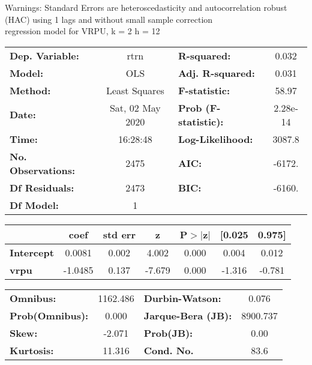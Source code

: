 Warnings: \newline
 [1] Standard Errors are heteroscedasticity and autocorrelation robust (HAC) using 1 lags and without small sample correction\\ 

regression model for VRPU, k = 2 h = 12\begin{center}
\begin{tabular}{lclc}
\toprule
\textbf{Dep. Variable:}    &       rtrn       & \textbf{  R-squared:         } &     0.032   \\
\textbf{Model:}            &       OLS        & \textbf{  Adj. R-squared:    } &     0.031   \\
\textbf{Method:}           &  Least Squares   & \textbf{  F-statistic:       } &     58.97   \\
\textbf{Date:}             & Sat, 02 May 2020 & \textbf{  Prob (F-statistic):} &  2.28e-14   \\
\textbf{Time:}             &     16:28:48     & \textbf{  Log-Likelihood:    } &    3087.8   \\
\textbf{No. Observations:} &        2475      & \textbf{  AIC:               } &    -6172.   \\
\textbf{Df Residuals:}     &        2473      & \textbf{  BIC:               } &    -6160.   \\
\textbf{Df Model:}         &           1      & \textbf{                     } &             \\
\bottomrule
\end{tabular}
\begin{tabular}{lcccccc}
                   & \textbf{coef} & \textbf{std err} & \textbf{z} & \textbf{P$> |$z$|$} & \textbf{[0.025} & \textbf{0.975]}  \\
\midrule
\textbf{Intercept} &       0.0081  &        0.002     &     4.002  &         0.000        &        0.004    &        0.012     \\
\textbf{vrpu}      &      -1.0485  &        0.137     &    -7.679  &         0.000        &       -1.316    &       -0.781     \\
\bottomrule
\end{tabular}
\begin{tabular}{lclc}
\textbf{Omnibus:}       & 1162.486 & \textbf{  Durbin-Watson:     } &    0.076  \\
\textbf{Prob(Omnibus):} &   0.000  & \textbf{  Jarque-Bera (JB):  } & 8900.737  \\
\textbf{Skew:}          &  -2.071  & \textbf{  Prob(JB):          } &     0.00  \\
\textbf{Kurtosis:}      &  11.316  & \textbf{  Cond. No.          } &     83.6  \\
\bottomrule
\end{tabular}
\end{center}

